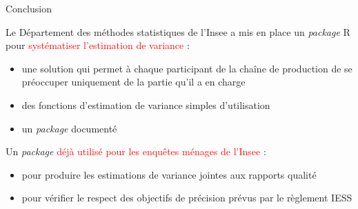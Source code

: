 \documentclass[xcolor=dvipsnames]{beamer}
\begin{document}
\begin{frame}{Conclusion}

Le Département des méthodes statistiques de l'Insee a mis en place un \textit{package} R pour \textcolor{red}{systématiser l'estimation de variance} :
\vspace{0.1 cm}
\begin{itemize}
    \item une solution qui permet à chaque participant de la chaîne de production de se préoccuper uniquement de la partie qu'il a en charge
    \vspace{0.1 cm}
    \item des fonctions d'estimation de variance simples d'utilisation
    \vspace{0.1 cm}
    \item un \textit{package} documenté
\end{itemize}

\vspace{0.5 cm}

Un \textit{package} \textcolor{red}{déjà utilisé pour les enquêtes ménages de l'Insee} :
\begin{itemize}
    \vspace{0.1 cm}
    \item pour produire les estimations de variance jointes aux rapports qualité
    \vspace{0.1 cm}
    \item pour vérifier le respect des objectifs de précision prévus par le règlement IESS
\end{itemize}

\end{frame}
\end{document}
